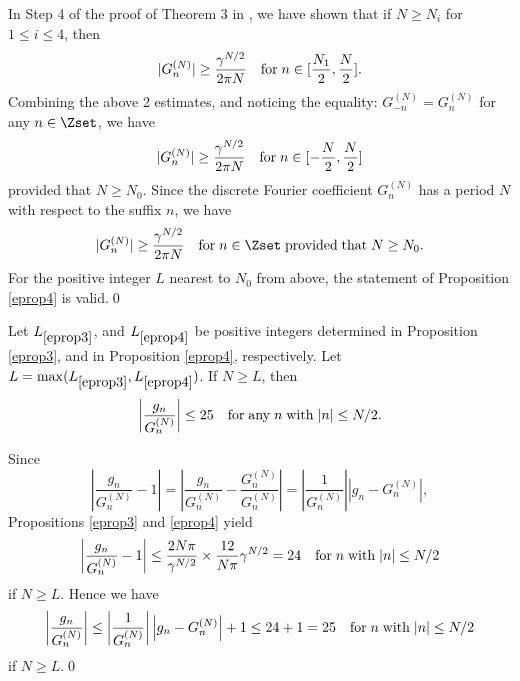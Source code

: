 \begin{pf}
In Step 4 of the proof of Theorem 3 in \cite{ushijima-chiba1}, we have shown that if $N \ge {{N}}_i$ for $1 \le i \le 4$, then
\begin{displaymath}
|G^{(N)}_n| \ge \frac{\gamma^{N/2}}{2\pi N} \quad {\rm for}\;n\in[\frac{{{N}}_1}{2},\frac{N}{2}].
\end{displaymath}
Combining the above 2 estimates, and noticing the equality: $G^{(N)}_{-n}=G^{(N)}_n$ for any $n\in\Zset$, we have
\begin{displaymath}
|G^{(N)}_n| \ge \frac{\gamma^{N/2}}{2\pi N} \quad {\rm for}\;n\in[-\frac{N}{2},\frac{N}{2}]
\end{displaymath}
provided that $N \ge {{N}}_0$. Since the discrete Fourier coefficient $G^{(N)}_n$ has a period $N$ with respect to the suffix $n$, we have 
\begin{displaymath}
|G^{(N)}_n| \ge \frac{\gamma^{N/2}}{2\pi N} \quad {\rm for}\;n\in\Zset\;{\rm provided}\;{\rm that}\;N \ge {{N}}_0.
\end{displaymath}
For the positive integer $L$ nearest to ${{N}}_0$ from above, the statement of Proposition \ref{eprop4} is valid.\qed
\end{pf}

\begin{prop}
\label{eprop5}
Let $L_{\ref{eprop3}}$, and $L_{\ref{eprop4}}$ be positive integers determined in Proposition \ref{eprop3}, and in Proposition \ref{eprop4}, respectively. Let $L=\max(L_{\ref{eprop3}},L_{\ref{eprop4}})$. If $N \ge L$, then
\begin{displaymath}
\left|\frac{g_n}{G^{(N)}_n}\right| \le 25 \quad {\rm for}\;{\rm any}\;n\;{\rm with}\; |n| \le N/2.
\nonumber
\end{displaymath}
\end{prop}
\begin{pf}
Since
\begin{displaymath}
\left|\frac{g_n}{G^{(N)}_n}-1\right|=\left|\frac{g_n}{G^{(N)}_n}-\frac{G^{(N)}_n}{G^{(N)}_n}\right|=\left|\frac{1}{G^{(N)}_n}\right|\left|g_n-G^{(N)}_n\right|,
\end{displaymath}
Propositions \ref{eprop3} and \ref{eprop4} yield
\begin{displaymath}
\left|\frac{g_n}{G^{(N)}_n}-1\right| \le \frac{2N\pi}{\gamma^{N/2}}\times \frac{12}{N\pi}\gamma^{N/2}=24 \quad {\rm for}\;n\;{\rm with}\; |n| \le N/2
\end{displaymath}
if $N \ge L$. Hence we have
\begin{eqnarray*}
\begin{array}{lll}
\displaystyle \left|\frac{g_n}{G^{(N)}_n}\right| \le \displaystyle\left|\frac{1}{G^{(N)}_n}\right|\left|g_n-G^{(N)}_n\right|+1 \le 24+1 =25 
 \quad {\rm for}\;n\;{\rm with}\; |n| \le N/2
\end{array}
\end{eqnarray*}
if $N \ge L$.\qed
\end{pf}

